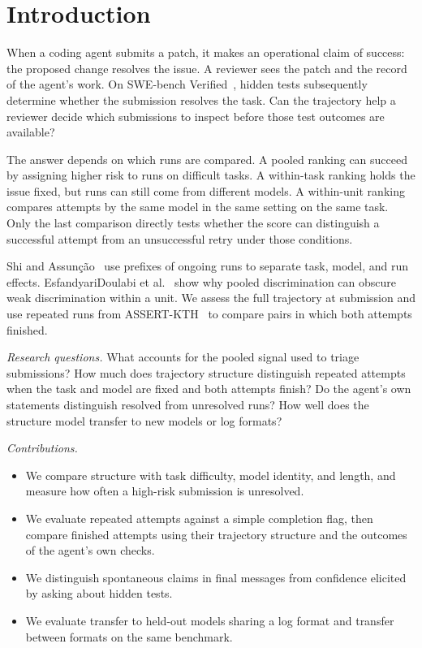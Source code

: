\section{Introduction}
\label{sec:introduction}

When a coding agent submits a patch, it makes an operational claim of success: the proposed change resolves the issue. A reviewer sees the patch and the record of the agent's work. On SWE-bench Verified~\cite{jimenez2024swebench,openai2024sweverified}, hidden tests subsequently determine whether the submission resolves the task. Can the trajectory help a reviewer decide which submissions to inspect before those test outcomes are available?

The answer depends on which runs are compared. A pooled ranking can succeed by assigning higher risk to runs on difficult tasks. A within-task ranking holds the issue fixed, but runs can still come from different models. A within-unit ranking compares attempts by the same model in the same setting on the same task. Only the last comparison directly tests whether the score can distinguish a successful attempt from an unsuccessful retry under those conditions.

Shi and Assun\c{c}\~ao~\cite{shi2026hardissue} use prefixes of ongoing runs to separate task, model, and run effects. EsfandyariDoulabi et al.~\cite{esfandyaridoulabi2026disentangling} show why pooled discrimination can obscure weak discrimination within a unit. We assess the full trajectory at submission and use repeated runs from ASSERT-KTH~\cite{assertkth2026artifacts} to compare pairs in which both attempts finished.

\emph{Research questions.} What accounts for the pooled signal used to triage submissions? How much does trajectory structure distinguish repeated attempts when the task and model are fixed and both attempts finish? Do the agent's own statements distinguish resolved from unresolved runs? How well does the structure model transfer to new models or log formats?

\emph{Contributions.}
\begin{itemize}
\item We compare structure with task difficulty, model identity, and length, and measure how often a high-risk submission is unresolved.
\item We evaluate repeated attempts against a simple completion flag, then compare finished attempts using their trajectory structure and the outcomes of the agent's own checks.
\item We distinguish spontaneous claims in final messages from confidence elicited by asking about hidden tests.
\item We evaluate transfer to held-out models sharing a log format and transfer between formats on the same benchmark.
\end{itemize}
